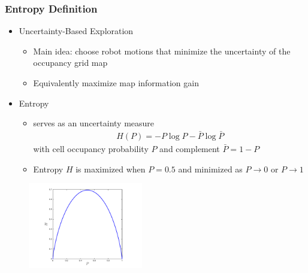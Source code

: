 \documentclass[11pt,professionalfonts,hyperref={pdftex,pdfpagemode=none,pdfstartview=FitH}]{beamer}
\renewcommand{\emph}[1]{\textit{\textbf{\color{blue}{#1}}}}
\begin{document}
\begin{frame}
\frametitle{Entropy Definition}
\begin{itemize}
        	\item Uncertainty-Based Exploration
	\begin{itemize}
		\item Main idea: choose robot motions that minimize the uncertainty of the occupancy grid map
		\item Equivalently maximize map information gain
	\end{itemize}
\end{itemize}
\begin{minipage}[t]{7.0cm}
\begin{itemize}
	\item Entropy
	\begin{itemize}		
		\item \emph{Shannon's entropy} serves as an uncertainty measure
		\begin{align*}
			H(P)=-P\log P-\bar{P}\log \bar{P}%
		\end{align*}
		with cell occupancy probability $P$ and complement $\bar{P}=1-P$
		\item Entropy $H$ is maximized when $P=0.5$ and minimized as $P\rightarrow0$ or $P\rightarrow1$
	\end{itemize}
\end{itemize}
\end{minipage}
\begin{minipage}[t]{3.0cm}
\vspace*{0.5cm}
\begin{figure}[!htbp]
	\centerline{
		\hspace*{1.25cm}
   		\includegraphics[width=5.0cm]{H_Plotted_square.pdf}%
	}
\end{figure}
\end{minipage}

\end{frame}
\end{document}
